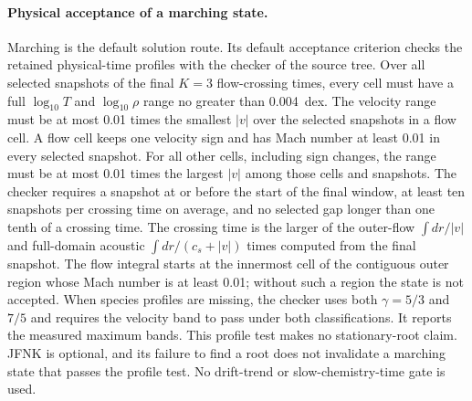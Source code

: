\documentclass[english,a4paper]{my_memo}
\begin{document}
\paragraph{Physical acceptance of a marching state.}
Marching is the default solution route. Its default acceptance criterion
checks the retained physical-time profiles with the checker
 of the source tree. Over all selected snapshots
of the final $K=3$ flow-crossing times, every cell must have a full
$\log_{10}T$ and $\log_{10}\rho$ range no greater than 0.004~dex.
The velocity range must be at most 0.01 times the smallest $|v|$ over the
selected snapshots in a flow cell. A flow cell keeps one velocity sign and
has Mach number at least 0.01 in every selected snapshot. For all other
cells, including sign changes, the range must be at most 0.01 times the
largest $|v|$ among those cells and snapshots. The checker requires a
snapshot at or before the start of the final window, at least ten snapshots
per crossing time on average, and no selected gap longer than one tenth of
a crossing time. The crossing time is the larger of the outer-flow
$\int dr/|v|$ and full-domain acoustic $\int dr/(c_s+|v|)$ times computed
from the final snapshot. The flow integral starts at the innermost cell of
the contiguous outer region whose Mach number is at least 0.01; without
such a region the state is not accepted. When species profiles are missing,
the checker uses both $\gamma=5/3$ and $7/5$ and requires the velocity band
to pass under both classifications. It reports the measured maximum bands.
This profile test makes no stationary-root claim. JFNK is optional, and its
failure to find a root does not invalidate a marching state that passes the
profile test. No drift-trend or slow-chemistry-time gate is used.
\end{document}
